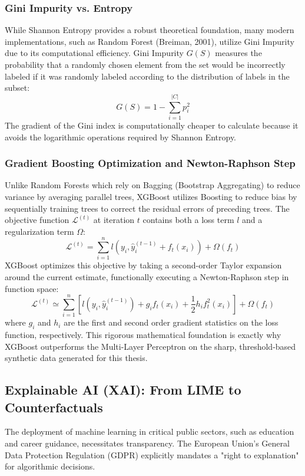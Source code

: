 \subsubsection{Gini Impurity vs. Entropy}
While Shannon Entropy provides a robust theoretical foundation, many modern implementations, such as Random Forest \parencite{breiman2001random} (Breiman, 2001), utilize Gini Impurity due to its computational efficiency. Gini Impurity $G(S)$ measures the probability that a randomly chosen element from the set would be incorrectly labeled if it was randomly labeled according to the distribution of labels in the subset:
\begin{equation}
    G(S) = 1 - \sum_{i=1}^{|C|} p_i^2
\end{equation}
The gradient of the Gini index is computationally cheaper to calculate because it avoids the logarithmic operations required by Shannon Entropy. 

\subsubsection{Gradient Boosting Optimization and Newton-Raphson Step}
Unlike Random Forests which rely on Bagging (Bootstrap Aggregating) to reduce variance by averaging parallel trees, XGBoost \parencite{chen2016xgboost} utilizes Boosting to reduce bias by sequentially training trees to correct the residual errors of preceding trees. The objective function $\mathcal{L}^{(t)}$ at iteration $t$ contains both a loss term $l$ and a regularization term $\Omega$:
\begin{equation}
    \mathcal{L}^{(t)} = \sum_{i=1}^n l(y_i, \hat{y}_i^{(t-1)} + f_t(x_i)) + \Omega(f_t)
\end{equation}
XGBoost optimizes this objective by taking a second-order Taylor expansion around the current estimate, functionally executing a Newton-Raphson step in function space:
\begin{equation}
    \mathcal{L}^{(t)} \simeq \sum_{i=1}^n \left[ l(y_i, \hat{y}_i^{(t-1)}) + g_i f_t(x_i) + \frac{1}{2} h_i f_t^2(x_i) \right] + \Omega(f_t)
\end{equation}
where $g_i$ and $h_i$ are the first and second order gradient statistics on the loss function, respectively. This rigorous mathematical foundation is exactly why XGBoost \parencite{chen2016xgboost} outperforms the Multi-Layer Perceptron \parencite{zhang2013review} on the sharp, threshold-based synthetic data generated for this thesis.

\subsection{Explainable AI (XAI): From LIME \parencite{lundberg2017unified} to Counterfactuals}
The deployment of machine learning in critical public sectors, such as education and career guidance, necessitates transparency. The European Union's General Data Protection Regulation (GDPR) explicitly mandates a "right to explanation" for algorithmic decisions. 

